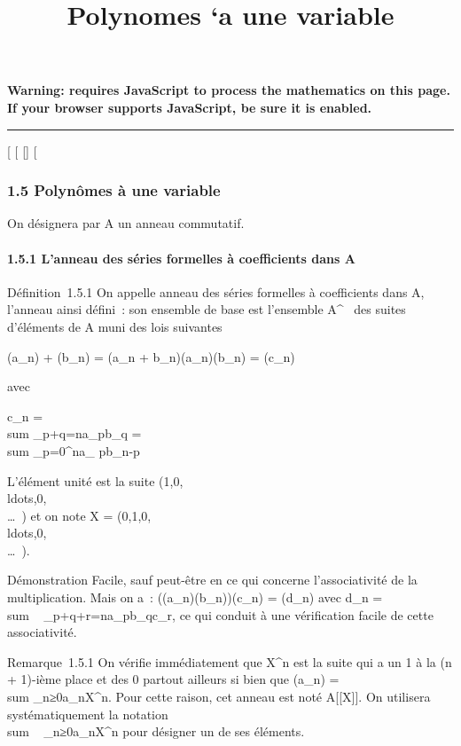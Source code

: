 \documentclass[]{article}
\title{Polynomes `a une variable}
\author{}
\date{}
\begin{document}
\maketitle

\textbf{Warning: 
requires JavaScript to process the mathematics on this page.\\ If your
browser supports JavaScript, be sure it is enabled.}

\begin{center}\rule{3in}{0.4pt}\end{center}

{[}
{[}
{[}{]}
{[}

\subsubsection{1.5 Polynômes à une variable}

On désignera par A un anneau commutatif.

\paragraph{1.5.1 L'anneau des séries formelles à coefficients dans A}

Définition~1.5.1 On appelle anneau des séries formelles à coefficients
dans A, l'anneau ainsi défini~: son ensemble de base est l'ensemble
A^~ des suites d'éléments de A muni des lois suivantes

(a\_n) + (b\_n) = (a\_n +
b\_n)\quad (a\_n)(b\_n) =
(c\_n)

avec

c\_n = \\sum
\_p+q=na\_pb\_q = \\sum
\_p=0^na\_ pb\_n-p

L'élément unité est la suite
(1,0,\\ldots,0,\\\ldots~)
et on note X =
(0,1,0,\\ldots,0,\\\ldots~).

Démonstration Facile, sauf peut-être en ce qui concerne l'associativité
de la multiplication. Mais on a~:
((a\_n)(b\_n))(c\_n) = (d\_n) avec
d\_n = \\sum ~
\_p+q+r=na\_pb\_qc\_r, ce qui conduit à
une vérification facile de cette associativité.

Remarque~1.5.1 On vérifie immédiatement que X^n est la suite
qui a un 1 à la (n + 1)-ième place et des 0 partout ailleurs si bien que
(a\_n) =\ \\sum
 \_n≥0a\_nX^n. Pour cette raison, cet
anneau est noté A{[}{[}X{]}{]}. On utilisera systématiquement la
notation \\sum ~
\_n≥0a\_nX^n pour désigner un de ses éléments.
\end{document}
